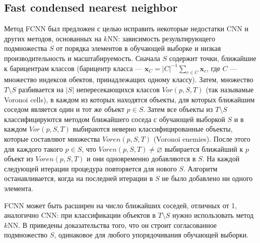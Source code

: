 \subsection{Fast condensed nearest neighbor}
Метод FCNN \cite{angiulli} был предложен с целью исправить некоторые недостатки CNN и других методов, основанных на \(k\)NN: зависимость результирующего подмножества \(S\) от порядка элементов в обучающей выборке и низкая производительность и масштабируемость. Сначала \(S\) содержит точки, ближайшие к барицентрам классов (барицентр класса --- \(\mathbf{x}_C=|C|^{-1}\sum_{c\in C}\mathbf{x}_c\), где \(C\) --- множество индексов обектов, принадлежащих одному классу). Затем, множество \(T\setminus S\) разбивается на \(|S|\) непересекающихся классов \(Vor(p, S, T)\) (так называмые Voronoi cells), в каждом из которых находятся объекты, для которых ближайшим соседом является один и тот же объект \(p\in S\). Затем все объекты из \(T\setminus S\) классифицируются методом ближайшего соседа с обучающей выборкой \(S\) и в каждом \(Vor(p, S, T)\) выбираются неверно классифицированные объекты, которые составляют множества \(Voren(p, S, T)\) (Voronoi enemies). После этого для каждого такого \(p\in S\), что \(Voren(p, S, T)\neq\varnothing\) выбирается ближайший к \(p\) объект из \(Voren(p, S, T)\) и они одновременно добавляются в \(S\). На каждой следующей итерации процедура повторяется для нового \(S\). Алгоритм останавливается, когда на последней итерации в \(S\) не было добавлено ни одного элемента.

FCNN может быть расширен на число ближайших соседей, отличных от 1, аналогично CNN: при классификации объектов в \(T\setminus S\) нужно использовать метод \(k\)NN. В \cite{angiulli} приведены доказательства того, что он строит согласованное подмножество \(S\), одинаковое для любого упорядочивания обучающей выборки.

